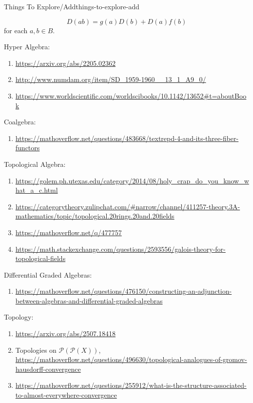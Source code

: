\begin{remark}{Things To Explore/Add}{things-to-explore-add}
\begin{enumerate}
\begin{enumerate}
                    \[
                        D(ab)%
                        =%
                        g(a)D(b)%
                        +%
                        D(a)f(b)%
                    \]%
                    for each $a,b\in B$.
            \end{enumerate}
    \end{enumerate}
    Hyper Algebra:
    \begin{enumerate}
        \item \url{https://arxiv.org/abs/2205.02362}
        \item \url{http://www.numdam.org/item/SD_1959-1960__13_1_A9_0/}
        \item \url{https://www.worldscientific.com/worldscibooks/10.1142/13652#t=aboutBook}
    \end{enumerate}
    Coalgebra:
    \begin{enumerate}
        \item \url{https://mathoverflow.net/questions/483668/textrepd-4-and-its-three-fiber-functors}
    \end{enumerate}
    Topological Algebra:
    \begin{enumerate}
        \item \url{https://golem.ph.utexas.edu/category/2014/08/holy\_crap\_do\_you\_know\_what\_a\_c.html}
        \item \url{https://categorytheory.zulipchat.com/#narrow/channel/411257-theory.3A-mathematics/topic/topological.20rings.20and.20fields}
        \item \url{https://mathoverflow.net/q/477757}
        \item \url{https://math.stackexchange.com/questions/2593556/galois-theory-for-topological-fields}
    \end{enumerate}
    Differential Graded Algebras:
    \begin{enumerate}
        \item \url{https://mathoverflow.net/questions/476150/constructing-an-adjunction-between-algebras-and-differential-graded-algebras}
    \end{enumerate}
    Topology:
    \begin{enumerate}
        \item \url{https://arxiv.org/abs/2507.18418}
        \item Topologies on $\mathcal{P}(\mathcal{P}(X))$, \url{https://mathoverflow.net/questions/496630/topological-analogues-of-gromov-hausdorff-convergence}
        \item \url{https://mathoverflow.net/questions/255912/what-is-the-structure-associated-to-almost-everywhere-convergence}

\end{enumerate}
\end{remark}
